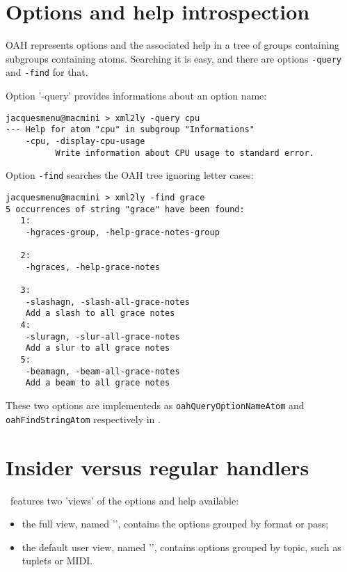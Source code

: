{\begin{lstlisting}[language=CPlusPlus]
\end{lstlisting}


\section{Options and help introspection}

OAH represents options and the associated help in a tree of groups containing subgroups containing atoms. Searching it is easy, and there are options {\tt -query} and {\tt -find} for that.

Option '-query' provides informations about an option name:
\begin{lstlisting}[language=Terminal]
jacquesmenu@macmini > xml2ly -query cpu
--- Help for atom "cpu" in subgroup "Informations"
    -cpu, -display-cpu-usage
          Write information about CPU usage to standard error.
\end{lstlisting}

Option {\tt -find} searches the OAH tree ignoring letter cases:
\begin{lstlisting}[language=Terminal]
jacquesmenu@macmini > xml2ly -find grace
5 occurrences of string "grace" have been found:
   1:
    -hgraces-group, -help-grace-notes-group

   2:
    -hgraces, -help-grace-notes

   3:
    -slashagn, -slash-all-grace-notes
    Add a slash to all grace notes
   4:
    -sluragn, -slur-all-grace-notes
    Add a slur to all grace notes
   5:
    -beamagn, -beam-all-grace-notes
    Add a beam to all grace notes
\end{lstlisting}

These two options are implementeds as {\tt oahQueryOptionNameAtom} and {\tt oahFindStringAtom} respectively in .


\section{Insider versus regular handlers}

\mf\ features two 'views' of the options and help available:
\begin{itemize}
\item the full view, named '\insider', contains the options grouped by format or pass;
\item the default user view, named '\regular', contains options grouped by topic, such as tuplets or MIDI.
\end{itemize}

}
